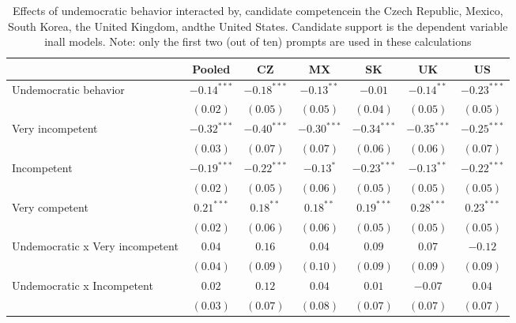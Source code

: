 
\begin{table}[!htbp]
\caption{Effects of undemocratic behavior interacted by, candidate competencein the Czech Republic, Mexico, South Korea, the United Kingdom, andthe United States. Candidate support is the dependent variable inall models.  Note: only the first two (out of ten) prompts are used in these calculations}
\begin{center}
\begin{tabular}{l c c c c c c}
\hline
 & Pooled & CZ & MX & SK & UK & US \\
\hline
Undemocratic behavior           & $-0.14^{***}$ & $-0.18^{***}$ & $-0.13^{**}$  & $-0.01$       & $-0.14^{**}$  & $-0.23^{***}$ \\
                                & $(0.02)$      & $(0.05)$      & $(0.05)$      & $(0.04)$      & $(0.05)$      & $(0.05)$      \\
Very incompetent                & $-0.32^{***}$ & $-0.40^{***}$ & $-0.30^{***}$ & $-0.34^{***}$ & $-0.35^{***}$ & $-0.25^{***}$ \\
                                & $(0.03)$      & $(0.07)$      & $(0.07)$      & $(0.06)$      & $(0.06)$      & $(0.07)$      \\
Incompetent                     & $-0.19^{***}$ & $-0.22^{***}$ & $-0.13^{*}$   & $-0.23^{***}$ & $-0.13^{**}$  & $-0.22^{***}$ \\
                                & $(0.02)$      & $(0.05)$      & $(0.06)$      & $(0.05)$      & $(0.05)$      & $(0.05)$      \\
Very competent                  & $0.21^{***}$  & $0.18^{**}$   & $0.18^{**}$   & $0.19^{***}$  & $0.28^{***}$  & $0.23^{***}$  \\
                                & $(0.02)$      & $(0.06)$      & $(0.06)$      & $(0.05)$      & $(0.05)$      & $(0.05)$      \\
Undemocratic x Very incompetent & $0.04$        & $0.16$        & $0.04$        & $0.09$        & $0.07$        & $-0.12$       \\
                                & $(0.04)$      & $(0.09)$      & $(0.10)$      & $(0.09)$      & $(0.09)$      & $(0.09)$      \\
Undemocratic x Incompetent      & $0.02$        & $0.12$        & $0.04$        & $0.01$        & $-0.07$       & $0.04$        \\
                                & $(0.03)$      & $(0.07)$      & $(0.08)$      & $(0.07)$      & $(0.07)$      & $(0.07)$      \\

\end{tabular}
\end{center}
\end{table}
